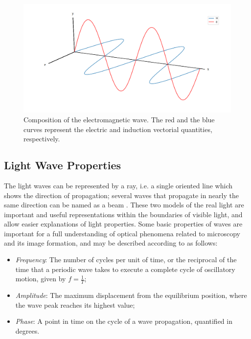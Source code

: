 \begin{figure}[htb]
	\centering
	\caption{\label{fig:electromagnetic_wave} 
		Composition of the electromagnetic wave. The red and the blue curves represent the electric and induction vectorial quantities, respectively.}
	\begin{center}
	    \includegraphics[scale=0.3]
			{images/fig2.png}
	\end{center}
	\centering
	\fautor
\end{figure}

\subsection{Light Wave Properties}

The light waves can be represented by a ray, i.e. a single oriented line which shows the direction of propagation; several waves that propagate in nearly the same direction can be named as a beam \cite{halliday2013fundamentals}. These two models of the real light are important and useful representations within the boundaries of visible light, and allow easier explanations of light properties. Some basic properties of waves are important for a full understanding of optical phenomena related to microscopy and its image formation, and may be described according to \cite{tipler2007physics} as follows:

\begin{itemize}
    \item \emph{Frequency}: The number of cycles per unit of time, or the reciprocal of the time that a periodic wave takes to execute a complete cycle of oscillatory motion, given by $f = \frac{1}{T}$;
    
    \item \emph{Amplitude}: The maximum displacement from the equilibrium position, where the wave peak reaches its highest value;
    
    \item \emph{Phase}: A point in time on the cycle of a wave propagation, quantified in degrees.
\end{itemize}

